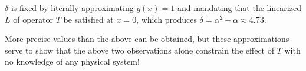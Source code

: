 \documentclass[10pt]{article}
\begin{document}
$\delta$ is fixed by literally approximating $g(x) = 1$ and mandating that the
linearized $L$ of operator $T$ be satisfied at $x=0$, which produces
$\delta = \alpha^2 - \alpha \approx 4.73$.

More precise values than the above can be obtained, but these approximations
serve to show that the above two observations alone constrain the effect of $T$
with no knowledge of any physical system!
\end{document}
